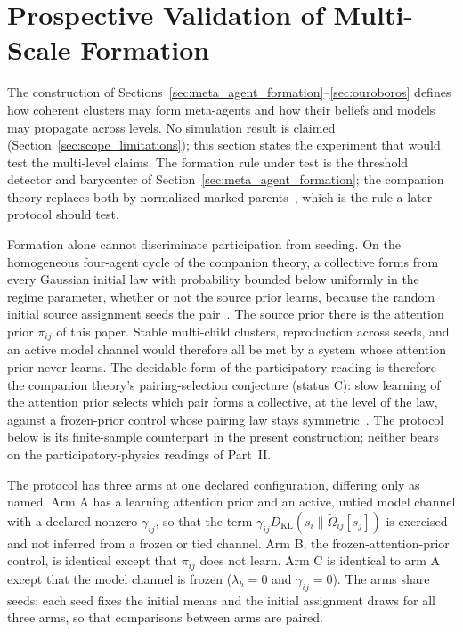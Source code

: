 \section{Prospective Validation of Multi-Scale Formation}\label{sec:participatory}

The construction of Sections~\ref{sec:meta_agent_formation}--\ref{sec:ouroboros} defines how coherent clusters may form meta-agents and how their beliefs and models may propagate across levels. No simulation result is claimed (Section~\ref{sec:scope_limitations}); this section states the experiment that would test the multi-level claims. The formation rule under test is the threshold detector and barycenter of Section~\ref{sec:meta_agent_formation}; the companion theory replaces both by normalized marked parents~\cite[Ch.~13]{DennisGaugeVFE2026}, which is the rule a later protocol should test.

Formation alone cannot discriminate participation from seeding. On the homogeneous four-agent cycle of the companion theory, a collective forms from every Gaussian initial law with probability bounded below uniformly in the regime parameter, whether or not the source prior learns, because the random initial source assignment seeds the pair~\cite[Ch.~14, the seeded-contrast-formation proposition]{DennisGaugeVFE2026}. The source prior there is the attention prior $\pi_{ij}$ of this paper. Stable multi-child clusters, reproduction across seeds, and an active model channel would therefore all be met by a system whose attention prior never learns. The decidable form of the participatory reading is therefore the companion theory's pairing-selection conjecture (status C): slow learning of the attention prior selects which pair forms a collective, at the level of the law, against a frozen-prior control whose pairing law stays symmetric~\cite[Ch.~14, the pairing-selection conjecture]{DennisGaugeVFE2026}. The protocol below is its finite-sample counterpart in the present construction; neither bears on the participatory-physics readings of Part~II.

The protocol has three arms at one declared configuration, differing only as named. Arm A has a learning attention prior and an active, untied model channel with a declared nonzero $\gamma_{ij}$, so that the term $\gamma_{ij} D_{\mathrm{KL}}(s_i\|\tilde\Omega_{ij}[s_j])$ is exercised and not inferred from a frozen or tied channel. Arm B, the frozen-attention-prior control, is identical except that $\pi_{ij}$ does not learn. Arm C is identical to arm A except that the model channel is frozen ($\lambda_h = 0$ and $\gamma_{ij} = 0$). The arms share seeds: each seed fixes the initial means and the initial assignment draws for all three arms, so that comparisons between arms are paired.


